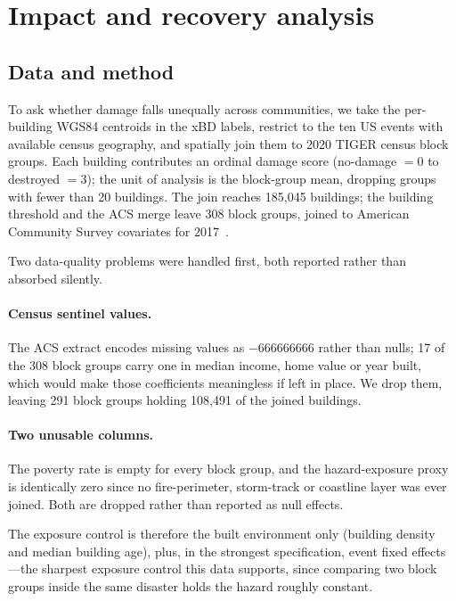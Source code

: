 \documentclass[10pt,twocolumn]{article}
\newcommand{\class}[1]{\textsf{#1}}
\begin{document}
\section{Impact and recovery analysis}
\label{sec:socio}

\subsection{Data and method}

To ask whether damage falls unequally across communities, we take the per-building WGS84 centroids in
the xBD labels, restrict to the ten US events with available census geography, and spatially join
them to 2020 TIGER census block groups. Each building contributes an ordinal damage score
(\class{no-damage} $= 0$ to \class{destroyed} $= 3$); the unit of analysis is the block-group mean,
dropping groups with fewer than 20 buildings. The join reaches 185,045 buildings; the building
threshold and the ACS merge leave 308 block groups, joined to American Community Survey covariates
for 2017~\cite{acs}.

Two data-quality problems were handled first, both reported rather than absorbed silently.

\paragraph{Census sentinel values.} The ACS extract encodes missing values as $-666666666$ rather
than nulls; 17 of the 308 block groups carry one in median income, home value or year built, which
would make those coefficients meaningless if left in place. We drop them, leaving 291 block groups
holding 108,491 of the joined buildings.

\paragraph{Two unusable columns.} The poverty rate is empty for every block group, and the
hazard-exposure proxy is identically zero since no fire-perimeter, storm-track or coastline layer was
ever joined. Both are dropped rather than reported as null effects.

The exposure control is therefore the built environment only (building density and median building
age), plus, in the strongest specification, event fixed effects---the sharpest exposure control this
data supports, since comparing two block groups inside the same disaster holds the hazard roughly
constant.
\end{document}
